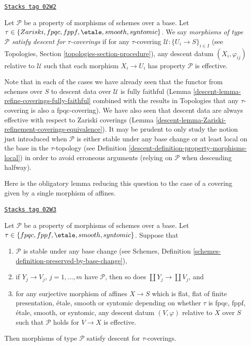 \begin{definition}
\label{descent-definition-descending-types-morphisms}
\href{https://stacks.math.columbia.edu/tag/02W2}{\texttt{Stacks tag 02W2}}

Let $\mathcal{P}$ be a property of morphisms of schemes over a base.
Let $\tau \in \{Zariski, fpqc, fppf, \etale, smooth, syntomic\}$.
We say
{\it morphisms of type $\mathcal{P}$ satisfy descent for $\tau$-coverings}
if for
any $\tau$-covering $\mathcal{U} : \{U_i \to S\}_{i \in I}$
(see Topologies, Section \ref{topologies-section-procedure}),
any descent datum $(X_i, \varphi_{ij})$ relative to $\mathcal{U}$
such that each morphism $X_i \to U_i$ has property $\mathcal{P}$
is effective.
\end{definition}

Note that in each of the cases we have already seen that
the functor from schemes over $S$ to descent data over
$\mathcal{U}$ is fully faithful
(Lemma \ref{descent-lemma-refine-coverings-fully-faithful} combined
with the results in Topologies that any $\tau$-covering
is also a fpqc-covering).
We have also seen that descent data are always effective with
respect to Zariski coverings
(Lemma \ref{descent-lemma-Zariski-refinement-coverings-equivalence}).
It may be prudent to only study the notion just introduced
when $\mathcal{P}$ is either stable under any base change or at least
local on the base in the $\tau$-topology
(see Definition \ref{descent-definition-property-morphisms-local})
in order to avoid erroneous arguments (relying on $\mathcal{P}$
when descending halfway).

\medskip\noindent
Here is the obligatory lemma reducing this question
to the case of a covering given by a single morphism of affines.

\begin{lemma}
\label{descent-lemma-descending-types-morphisms}
\href{https://stacks.math.columbia.edu/tag/02W3}{\texttt{Stacks tag 02W3}}

Let $\mathcal{P}$ be a property of morphisms of schemes over a base.
Let $\tau \in \{fpqc, fppf, \etale, smooth, syntomic\}$.
Suppose that
\begin{enumerate}
\item $\mathcal{P}$ is stable under any base change
(see Schemes, Definition \ref{schemes-definition-preserved-by-base-change}),
\item if $Y_j \to V_j$, $j = 1, \ldots, m$ have $\mathcal{P}$,
then so does $\coprod Y_j \to \coprod V_j$, and
\item for any surjective morphism of affines
$X \to S$ which is flat, flat of finite presentation,
\'etale, smooth or syntomic depending on whether $\tau$ is
fpqc, fppf, \'etale, smooth, or syntomic,
any descent datum $(V, \varphi)$ relative
to $X$ over $S$ such that $\mathcal{P}$ holds for
$V \to X$ is effective.
\end{enumerate}
Then morphisms of type $\mathcal{P}$ satisfy descent for $\tau$-coverings.
\end{lemma}

